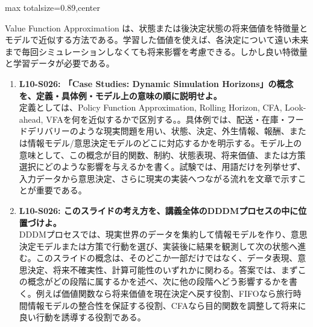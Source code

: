 \begin{minipage}[t]{0.58\textwidth}
\begin{adjustbox}{max totalsize={\textwidth}{0.89\textheight},center}
\begin{minipage}{\textwidth}
Value Function Approximation は、状態または後決定状態の将来価値を特徴量とモデルで近似する方法である。学習した価値を使えば、各決定について遠い未来まで毎回シミュレーションしなくても将来影響を考慮できる。しかし良い特徴量と学習データが必要である。\par{}\begin{enumerate}\item \textbf{L10-S026: 「Case Studies: Dynamic Simulation Horizons」の概念を、定義・具体例・モデル上の意味の順に説明せよ。}\\定義としては、Policy Function Approximation, Rolling Horizon, CFA, Look-ahead, VFAを何を近似するかで区別する。。具体例では、配送・在庫・フードデリバリーのような現実問題を用い、状態、決定、外生情報、報酬、または情報モデル/意思決定モデルのどこに対応するかを明示する。モデル上の意味として、この概念が目的関数、制約、状態表現、将来価値、または方策選択にどのような影響を与えるかを書く。試験では、用語だけを列挙せず、入力データから意思決定、さらに現実の実装へつながる流れを文章で示すことが重要である。\item \textbf{L10-S026: このスライドの考え方を、講義全体のDDDMプロセスの中に位置づけよ。}\\DDDMプロセスでは、現実世界のデータを集約して情報モデルを作り、意思決定モデルまたは方策で行動を選び、実装後に結果を観測して次の状態へ進む。このスライドの概念は、そのどこか一部だけではなく、データ表現、意思決定、将来不確実性、計算可能性のいずれかに関わる。答案では、まずこの概念がどの段階に属するかを述べ、次に他の段階へどう影響するかを書く。例えば価値関数なら将来価値を現在決定へ戻す役割、FIFOなら旅行時間情報モデルの整合性を保証する役割、CFAなら目的関数を調整して将来に良い行動を誘導する役割である。\end{enumerate}
\end{minipage}
\end{adjustbox}
\end{minipage}


